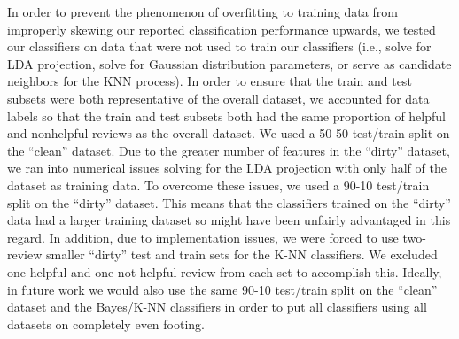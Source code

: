 In order to prevent the phenomenon of overfitting to training data from improperly skewing our reported classification performance upwards, we tested our classifiers on data that were not used to train our classifiers (i.e., solve for LDA projection, solve for Gaussian distribution parameters, or serve as candidate neighbors for the KNN process).
In order to ensure that the train and test subsets were both representative of the overall dataset, we accounted for data labels so that the train and test subsets both had the same proportion of helpful and nonhelpful reviews as the overall dataset. 
We used a 50-50 test/train split on the ``clean'' dataset.
Due to the greater number of features in the ``dirty'' dataset, we ran into numerical issues solving for the LDA projection with only half of the dataset as training data.
To overcome these issues, we used a 90-10 test/train split on the ``dirty'' dataset. 
This means that the classifiers trained on the ``dirty'' data had a larger training dataset so might have been unfairly advantaged in this regard.
In addition, due to implementation issues, we were forced to use two-review smaller ``dirty'' test and train sets for the K-NN classifiers.
We excluded one helpful and one not helpful review from each set to accomplish this.
Ideally, in future work we would also use the same 90-10 test/train split on the ``clean'' dataset and the Bayes/K-NN classifiers in order to put all classifiers using all datasets on completely even footing.
